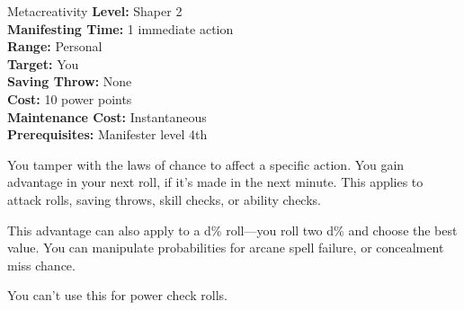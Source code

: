 {Metacreativity}
{
    \textbf{Level:}
    Shaper 2\\
    \textbf{Manifesting Time:}
    1 immediate action\\
    \textbf{Range:}
    Personal\\
    \textbf{Target:}
    You\\
    \textbf{Saving Throw:}
    None\\
    \textbf{Cost:}
    10 power points\\
    \textbf{Maintenance Cost:}
    Instantaneous\\
    \textbf{Prerequisites:}
    Manifester level 4th\\
}
{
    You tamper with the laws of chance to affect a specific action. You gain advantage in your next roll, if it's made in the next minute. This applies to attack rolls, saving throws, skill checks, or ability checks.

    This advantage can also apply to a d\% roll---you roll two d\% and choose the best value. You can manipulate probabilities for arcane spell failure, or concealment miss chance.

    You can't use this for power check rolls.
}

